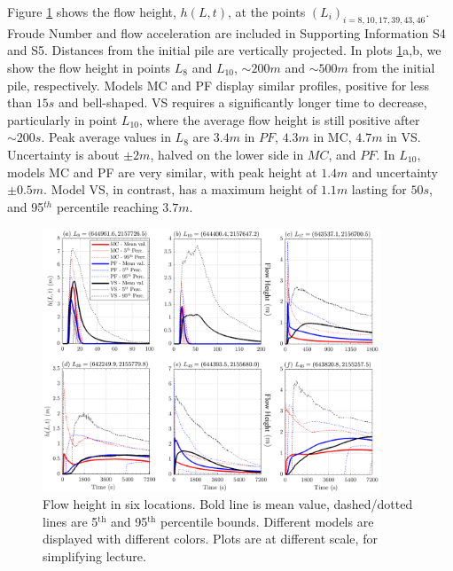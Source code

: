 \documentclass{article}
\begin{document}
Figure \ref{fig:Colima-H} shows the flow height, $h(L,t)$, at the points $(L_i)_{i=8,10,17,39,43,46}$. Froude Number and flow acceleration are included in Supporting Information S4 and S5. Distances from the initial pile are vertically projected. In plots \ref{fig:Colima-H}a,b, we show the flow height in points $L_8$ and $L_{10}$, $\sim 200 m$ and $\sim 500 m$ from the initial pile, respectively. Models MC and PF display similar profiles, positive for less than $15 s$ and bell-shaped. VS requires a significantly longer time to decrease, particularly in point $L_{10}$, where the average flow height is still positive after $\sim 200 s$. Peak average values in $L_8$ are $3.4 m$ in $PF$, $4.3 m$ in MC, $4.7 m$ in VS. Uncertainty is about $\pm 2 m$, halved on the lower side in $MC$, and $PF$. In $L_{10}$, models MC and PF are very similar, with peak height at $1.4 m$ and uncertainty $\pm 0.5 m$. Model VS, in contrast, has a maximum height of $1.1 m$ lasting for $50s$, and 95$^{th}$ percentile reaching $3.7 m$.
\begin{figure}[H]
         \centering
        \includegraphics[width=0.9\textwidth]{BAF_VolcanDeColima/LocalMeasurments/Height.png}
        \caption{Flow height in six locations. Bold line is mean value, dashed/dotted lines are 5$^{\mathrm{th}}$ and 95$^{\mathrm{th}}$ percentile bounds. Different models are displayed with different colors. Plots are at different scale, for simplifying lecture.}
        \label{fig:Colima-H}
\end{figure}
\end{document}
